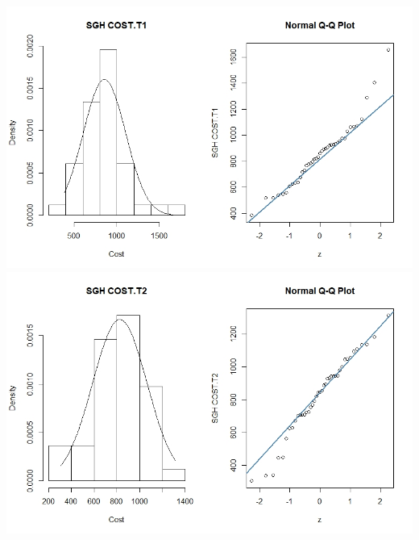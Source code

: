 \documentclass[11pt]{article}
\begin{document}
\includegraphics[width=15cm]{RStudio/jpeg/Norm SGH T1.jpeg}
\includegraphics[width=15cm]{RStudio/jpeg/Norm SGH T2.jpeg}
\end{document}
